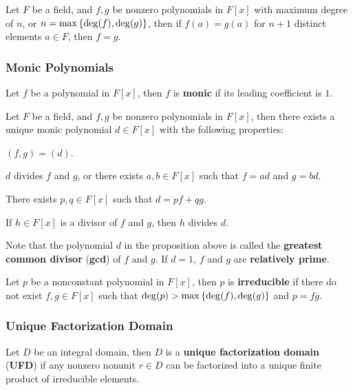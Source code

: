 \documentclass[a4paper,12pt]{article}
\begin{document}
\begin{crl}
  Let $F$ be a field, and $f,g$ be nonzero polynomials in $F[x]$ with maximum degree of $n$, or $n=\max\left\{ \deg(f),\deg(g)\right\}$, then if $f(a)=g(a)$ for $n+1$ distinct elements $a\in F$, then $f=g$.
\end{crl}

\subsubsection{Monic Polynomials}
\begin{dft}
  Let $f$ be a polynomial in $F[x]$, then $f$ is \textbf{monic} if its leading coefficient is $1$.
\end{dft}

\begin{pst}
  Let $F$ be a field, and $f,g$ be nonzero polynomials in $F[x]$, then there exists a unique monic polynomial $d\in F[x]$ with the following properties:

  \begin{alist}
    \item $(f,g)=(d)$.
    \item $d$ divides $f$ and $g$, or there exists $a,b\in F[x]$ such that $f=ad$ and $g=bd$.
    \item There exists $p,q\in F[x]$ such that $d=pf+qg$.
    \item If $h\in F[x]$ is a divisor of $f$ and $g$, then $h$ divides $d$.
  \end{alist}
\end{pst}\n

Note that the polynomial $d$ in the proposition above is called the \textbf{greatest common divisor} (\textbf{gcd}) of $f$ and $g$. If $d=1$, $f$ and $g$ are \textbf{relatively prime}.\n

\begin{dft}
  Let $p$ be a nonconstant polynomial in $F[x]$, then $p$ is \textbf{irreducible} if there do not exist $f,g\in F[x]$ such that $\deg(p)>\max\left\{ \deg(f),\deg(g)\right\}$ and $p=fg$.
\end{dft}

\subsubsection{Unique Factorization Domain}
\begin{dft}
  Let $D$ be an integral domain, then $D$ is a \textbf{unique factorization domain} (\textbf{UFD}) if any nonzero nonunit $r\in D$ can be factorized into a unique finite product of irreducible elements. 
\end{dft}\n
\end{document}
